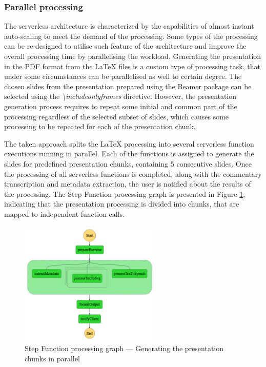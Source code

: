 \subsubsection{Parallel processing} \label{section:case-study-parallel-processing}

The serverless architecture is characterized by the capabilities of almost instant auto-scaling to meet the demand of the processing.
Some types of the processing can be re-designed to utilise such feature of the architecture and improve the overall processing time by parallelising the workload.
Generating the presentation in the PDF format from the LaTeX files is a custom type of processing task, that under some circumstances can be parallelised as well to certain degree.
The chosen slides from the presentation prepared using the Beamer package \cite{beamer} can be selected using the \textit{\textbackslash includeonlyframes} directive.
However, the presentation generation process requires to repeat some initial and common part of the processing regardless of the selected subset of slides, which causes some processing to be repeated for each of the presentation chunk.

The taken approach splits the LaTeX processing into several serverless function executions running in parallel. Each of the functions is assigned to generate the slides for predefined presentation chunks, containing 5 consecutive slides. Once the processing of all serverless functions is completed, along with the commentary transcription and metadata extraction, the user is notified about the results of the processing. The Step Function processing graph is presented in Figure \ref{fig:step-function-processing-the-presentation-in-parallel}, indicating that the presentation processing is divided into chunks, that are mapped to independent function calls.

\begin{figure}[H]
    \centering
    \includegraphics[width=0.6\textwidth]{assets/04-serverless-for-web-apps/stepFunctionGraphParallel.png}
    \caption{Step Function processing graph --- Generating the presentation chunks in parallel}
    \label{fig:step-function-processing-the-presentation-in-parallel}
\end{figure}

